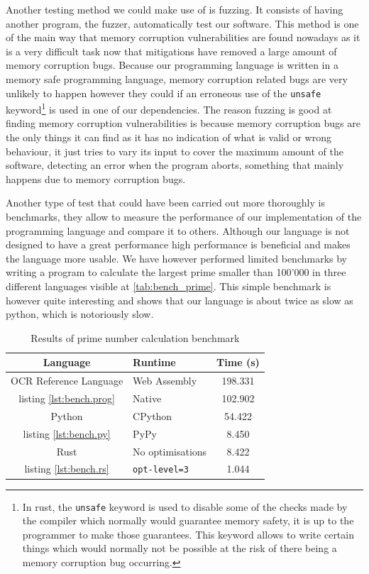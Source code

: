 \documentclass{article}
\begin{document}
Another testing method we could make use of is fuzzing. It consists of having
another program, the fuzzer, automatically test our software. This method is
one of the main way that memory corruption vulnerabilities are found nowadays
as it is a very difficult task now that mitigations have removed a large amount
of memory corruption bugs. Because our programming language is written in a
memory safe programming language, memory corruption related bugs are very
unlikely to happen however they could if an erroneous use of the
\texttt{unsafe} keyword\footnote{In rust, the \texttt{unsafe} keyword is used
to disable some of the checks made by the compiler which normally would
guarantee memory safety, it is up to the programmer to make those guarantees.
This keyword allows to write certain things which would normally not be
possible at the risk of there being a memory corruption bug occurring.} is used
in one of our dependencies. The reason fuzzing is good at finding memory
corruption vulnerabilities is because memory corruption bugs are the only
things it can find as it has no indication of what is valid or wrong behaviour,
it just tries to vary its input to cover the maximum amount of the software,
detecting an error when the program aborts, something that mainly happens due
to memory corruption bugs.

Another type of test that could have been carried out more thoroughly is
benchmarks, they allow to measure the performance of our implementation of the
programming language and compare it to others. Although our language is not
designed to have a great performance high performance is beneficial and makes
the language more usable. We have however performed limited benchmarks by
writing a program to calculate the largest prime smaller than 100'000 in three
different languages visible at \autoref{tab:bench_prime}. This simple benchmark
is however quite interesting and shows that our language is about twice as slow
as python, which is notoriously slow.

\begin{table}
	\begin{center}
		\begin{tabular}{|c|l|S|}
			\hline
			Language & Runtime & Time (s) \\
			\hline
			OCR Reference Language & Web Assembly & 198.331 \\
			listing \ref{lst:bench.prog} & Native & 102.902 \\
			\hline
			Python & CPython & 54.422 \\
			listing \ref{lst:bench.py} & PyPy & 8.450 \\
			\hline
			Rust & No optimisations & 8.422 \\
			listing \ref{lst:bench.rs} & \texttt{opt-level=3} & 1.044 \\
			\hline
		\end{tabular}
	\end{center}
	\caption{Results of prime number calculation benchmark}
	\label{tab:bench_prime}
\end{table}
\end{document}
